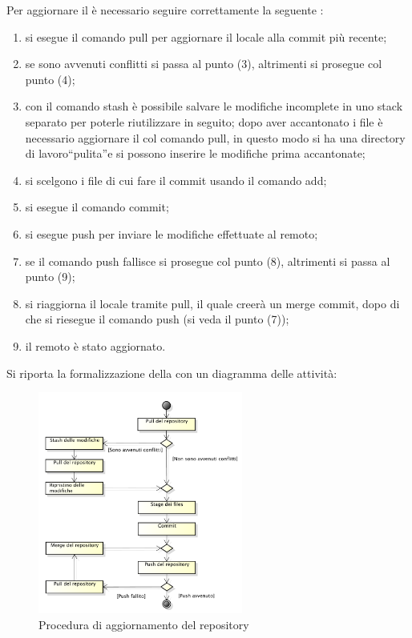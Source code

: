 					Per aggiornare il  è necessario seguire correttamente la seguente :
					\begin{enumerate}
						\item si esegue il comando  pull per aggiornare il  locale alla commit più recente;
						\item se sono avvenuti conflitti si passa al punto (3), altrimenti si prosegue col punto (4);
						\item con il comando  stash è possibile salvare le modifiche incomplete in uno stack separato per poterle riutilizzare in seguito; dopo aver accantonato i file è necessario aggiornare il  col comando  pull, in questo modo si ha una directory di lavoro“pulita”e si possono inserire le modifiche prima accantonate;
						\item si scelgono i file di cui fare il commit usando il comando  add;
						\item si esegue il comando  commit;
						\item si esegue  push per inviare le modifiche effettuate al  remoto;
						\item se il comando push fallisce si prosegue col punto (8), altrimenti si passa al punto (9);
						\item si riaggiorna il  locale tramite  pull, il quale creerà un merge commit, dopo di che si riesegue il comando push (si veda il punto (7));
						\item il  remoto è stato aggiornato.
					\end{enumerate}
					Si riporta la formalizzazione della  con un diagramma delle attività:
					\begin{figure}[H]
						\centering
						\includegraphics[width=0.6\textwidth]{NormeDiProgetto/Pics/Commit}
						\caption{Procedura di aggiornamento del repository}
					\end{figure}
